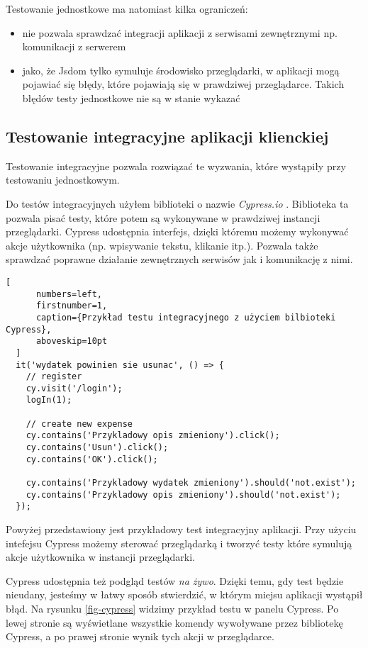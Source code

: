 Testowanie jednostkowe ma natomiast kilka ograniczeń:
\begin{itemize}
  \item nie pozwala sprawdzać integracji aplikacji z serwisami zewnętrznymi np. komunikacji z serwerem
  \item jako, że Jsdom tylko symuluje środowisko przeglądarki, w aplikacji mogą pojawiać się błędy, które pojawiają się w prawdziwej przeglądarce. Takich błędów testy jednostkowe nie są w stanie wykazać
\end{itemize}

\subsection{Testowanie integracyjne aplikacji klienckiej}
Testowanie integracyjne pozwala rozwiązać te wyzwania, które wystąpiły przy testowaniu jednostkowym.

Do testów integracyjnych użyłem biblioteki o nazwie \emph{Cypress.io} \cite{ref_cypress_doc}. Biblioteka ta pozwala pisać testy, które potem są wykonywane w prawdziwej instancji przeglądarki. Cypress udostępnia interfejs, dzięki któremu możemy wykonywać akcje użytkownika (np. wpisywanie tekstu, klikanie itp.). Pozwala także sprawdzać poprawne działanie zewnętrznych serwisów jak i komunikację z nimi.

  \begin{addmargin}[6mm]{0mm}
  \begin{lstlisting}[
      numbers=left,
      firstnumber=1,
      caption={Przykład testu integracyjnego z użyciem bilbioteki Cypress},
      aboveskip=10pt
  ]
  it('wydatek powinien sie usunac', () => {
    // register
    cy.visit('/login');
    logIn(1);

    // create new expense
    cy.contains('Przykladowy opis zmieniony').click();
    cy.contains('Usun').click();
    cy.contains('OK').click();

    cy.contains('Przykladowy wydatek zmieniony').should('not.exist');
    cy.contains('Przykladowy opis zmieniony').should('not.exist');
  });
  \end{lstlisting}
  \end{addmargin}
  Powyżej przedstawiony jest przykładowy test integracyjny aplikacji. Przy użyciu intefejsu Cypress możemy sterować przeglądarką i tworzyć testy które symulują akcje użytkownika w instancji przeglądarki.

Cypress udostępnia też podgląd testów \emph{na żywo}. Dzięki temu, gdy test będzie nieudany, jesteśmy w łatwy sposób stwierdzić, w którym miejsu aplikacji wystąpił błąd. Na rysunku \ref{fig-cypress} widzimy przykład testu w panelu Cypress. Po lewej stronie są wyświetlane wszystkie komendy wywoływane przez bibliotekę Cypress, a po prawej stronie wynik tych akcji w przeglądarce.

